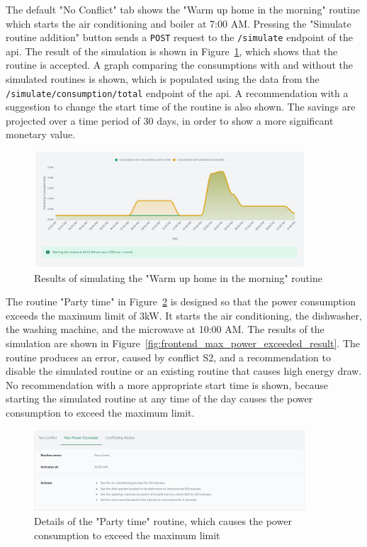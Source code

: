 The default "No Conflict" tab shows the "Warm up home in the morning" routine which starts the air conditioning and boiler at 7:00 AM. Pressing the "Simulate routine addition" button sends a \texttt{POST} request to the \texttt{/simulate} endpoint of the \acrshort{api}. The result of the simulation is shown in Figure~\ref{fig:frontend_no_conflict_result}, which shows that the routine is accepted. A graph comparing the consumptions with and without the simulated routines is shown, which is populated using the data from the \texttt{/simulate/consumption/total} endpoint of the \acrshort{api}. A recommendation with a suggestion to change the start time of the routine is also shown. The savings are projected over a time period of 30 days, in order to show a more significant monetary value.

\begin{figure}
    \centering
    \includegraphics[width=0.9\textwidth]{images/frontend/no_conflict_result.png}
    \caption{Results of simulating the "Warm up home in the morning" routine}
    \label{fig:frontend_no_conflict_result}
\end{figure}

The routine "Party time" in Figure~\ref{fig:frontend_max_power_exceeded} is designed so that the power consumption exceeds the maximum limit of 3kW. It starts the air conditioning, the dishwasher, the washing machine, and the microwave at 10:00 AM. The results of the simulation are shown in Figure~\ref{fig:frontend_max_power_exceeded_result}. The routine produces an error, caused by conflict S2, and a recommendation to disable the simulated routine or an existing routine that causes high energy draw. No recommendation with a more appropriate start time is shown, because starting the simulated routine at any time of the day causes the power consumption to exceed the maximum limit.

\begin{figure}
    \centering
    \includegraphics[width=0.9\textwidth]{images/frontend/max_power_exceeded.png}
    \caption{Details of the "Party time" routine, which causes the power consumption to exceed the maximum limit}
    \label{fig:frontend_max_power_exceeded}
\end{figure}

